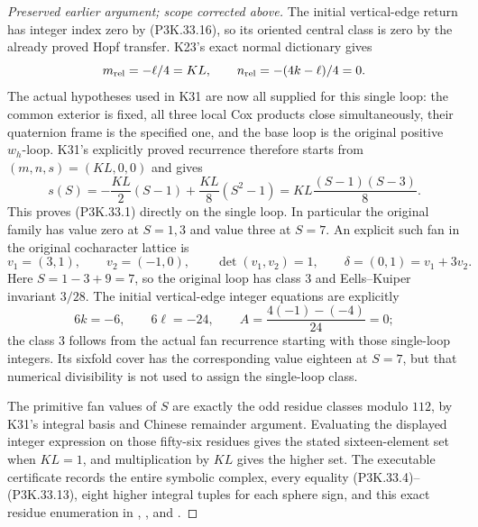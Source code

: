 \begin{proof}[Preserved earlier argument; scope corrected above]
The initial vertical-edge return has integer index zero by (P3K.33.16),
so its oriented central class is zero by the already proved Hopf
transfer. K23's exact normal dictionary gives
\[
 m_{\rm rel}=-\ell/4=KL,\qquad
 n_{\rm rel}=-(4k-\ell)/4=0.
\]
The actual hypotheses used in K31 are now all supplied for this
single loop: the common exterior is fixed, all three local Cox
products close simultaneously, their quaternion frame is the
specified one, and the base loop is the original positive
\(w_h\)-loop. K31's explicitly proved recurrence therefore
starts from \((m,n,s)=(KL,0,0)\) and gives
\[
 s(S)=-\frac{KL}{2}(S-1)+\frac{KL}{8}(S^2-1)
      =KL\frac{(S-1)(S-3)}8.
\]
This proves (P3K.33.1) directly on the single loop. In particular the
original family has value zero at \(S=1,3\) and value three
at \(S=7\). An explicit such fan in the original cocharacter
lattice is
\[
 v_1=(3,1),\qquad v_2=(-1,0),\qquad
 \det(v_1,v_2)=1,\qquad
 \delta=(0,1)=v_1+3v_2.
\]
Here \(S=1-3+9=7\), so the original loop has class \(3\)
and Eells--Kuiper invariant \(3/28\). The initial vertical-edge
integer equations are explicitly
\[
 6k=-6,\qquad6\ell=-24,\qquad
 A=\frac{4(-1)-(-4)}{24}=0;
\]
the class \(3\) follows from the actual fan recurrence starting
with those single-loop integers. Its sixfold cover has the corresponding value
eighteen at \(S=7\), but that numerical divisibility is not used
to assign the single-loop class.

The primitive fan values of \(S\) are exactly the odd residue
classes modulo \(112\), by K31's integral basis and Chinese
remainder argument. Evaluating the displayed integer expression
on those fifty-six residues gives the stated sixteen-element set
when \(KL=1\), and multiplication by \(KL\) gives the higher
set. The executable certificate records the entire symbolic
complex, every equality (P3K.33.4)--(P3K.33.13), eight higher integral
tuples for each sphere sign, and this exact residue enumeration in
,
, and
.
\end{proof}
